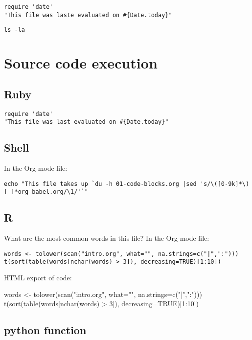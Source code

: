 \documentclass[11pt]{article}
\author{Bartev Vartanian}
\date{\today}
\title{}
\begin{document}
\tableofcontents

\begin{verbatim}
require 'date'
"This file was laste evaluated on #{Date.today}"
\end{verbatim}

\begin{verbatim}
ls -la
\end{verbatim}

\section{Source code execution}
\label{sec:orgc087493}

\subsection{Ruby}
\label{sec:org543ca1c}
\begin{verbatim}
require 'date'
"This file was last evaluated on #{Date.today}"
\end{verbatim}

\subsection{Shell}
\label{sec:orge672131}

In the Org-mode file:

\begin{verbatim}
echo "This file takes up `du -h 01-code-blocks.org |sed 's/\([0-9k]*\)[ ]*org-babel.org/\1/'`"
\end{verbatim}

\subsection{R}
\label{sec:org2e5ebfa}

What are the most common words in this file? In the Org-mode file:

\begin{verbatim}
words <- tolower(scan("intro.org", what="", na.strings=c("|",":")))
t(sort(table(words[nchar(words) > 3]), decreasing=TRUE)[1:10])
\end{verbatim}
HTML export of code:

words <- tolower(scan("intro.org", what="", na.strings=c("|",":")))
t(sort(table(words[nchar(words) > 3]), decreasing=TRUE)[1:10])

\subsection{python function}
\label{sec:orgb582d32}
\end{document}
